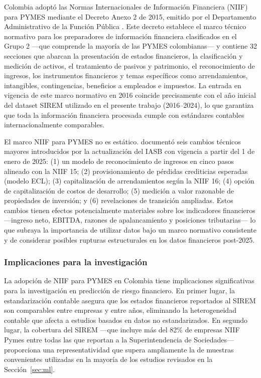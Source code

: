 \documentclass[12pt, letterpaper]{article}
\begin{document}
Colombia adopt\'o las Normas Internacionales de Informaci\'on Financiera (NIIF) para PYMES mediante el Decreto Anexo 2 de 2015, emitido por el Departamento Administrativo de la Funci\'on P\'ublica \citep{DAFP2015}. Este decreto establece el marco t\'ecnico normativo para los preparadores de informaci\'on financiera clasificados en el Grupo 2 ---que comprende la mayor\'ia de las PYMES colombianas--- y contiene 32 secciones que abarcan la presentaci\'on de estados financieros, la clasificaci\'on y medici\'on de activos, el tratamiento de pasivos y patrimonio, el reconocimiento de ingresos, los instrumentos financieros y temas espec\'ificos como arrendamientos, intangibles, contingencias, beneficios a empleados e impuestos. La entrada en vigencia de este marco normativo en 2016 coincide precisamente con el a\~no inicial del dataset SIREM utilizado en el presente trabajo (2016--2024), lo que garantiza que toda la informaci\'on financiera procesada cumple con est\'andares contables internacionalmente comparables.

El marco NIIF para PYMES no es est\'atico. \citet{Bubb2024} document\'o seis cambios t\'ecnicos mayores introducidos por la actualizaci\'on del IASB con vigencia a partir del 1 de enero de 2025: (1) un modelo de reconocimiento de ingresos en cinco pasos alineado con la NIIF 15; (2) provisionamiento de p\'erdidas crediticias esperadas (modelo ECL); (3) capitalizaci\'on de arrendamientos seg\'un la NIIF 16; (4) opci\'on de capitalizaci\'on de costos de desarrollo; (5) medici\'on a valor razonable de propiedades de inversi\'on; y (6) revelaciones de transici\'on ampliadas. Estos cambios tienen efectos potencialmente materiales sobre los indicadores financieros ---ingreso neto, EBITDA, razones de apalancamiento y posiciones tributarias--- lo que subraya la importancia de utilizar datos bajo un marco normativo consistente y de considerar posibles rupturas estructurales en los datos financieros post-2025.

\subsubsection{Implicaciones para la investigaci\'on}

La adopci\'on de NIIF para PYMES en Colombia tiene implicaciones significativas para la investigaci\'on en predicci\'on de riesgo financiero. En primer lugar, la estandarizaci\'on contable asegura que los estados financieros reportados al SIREM son comparables entre empresas y entre a\~nos, eliminando la heterogeneidad contable que afecta a estudios basados en datos no estandarizados. En segundo lugar, la cobertura del SIREM ---que incluye m\'as del 82\% de empresas NIIF Pymes entre todas las que reportan a la Superintendencia de Sociedades--- proporciona una representatividad que supera ampliamente la de muestras convenientes utilizadas en la mayor\'ia de los estudios revisados en la Secci\'on~\ref{sec:ml}.
\end{document}
